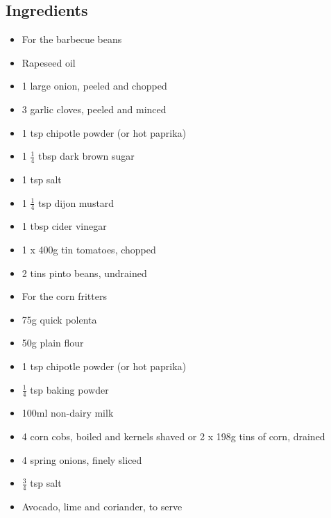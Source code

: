 \documentclass{book}
\begin{document}
\subsection*{Ingredients}
\begin{itemize}
\item For the barbecue beans 
\item Rapeseed oil 
\item 1 large onion, peeled and chopped 
\item 3 garlic cloves, peeled and minced 
\item 1 tsp chipotle powder (or hot paprika)
\item 1 $\frac{1}{4}$ tbsp dark brown sugar 
\item 1 tsp salt
\item 1 $\frac{1}{4}$ tsp dijon mustard 
\item 1 tbsp cider vinegar 
\item 1 x 400g tin tomatoes, chopped
\item 2 tins pinto beans, undrained
\end{itemize}

\begin{itemize}
\item For the corn fritters 
\item 75g quick polenta
\item 50g plain flour 
\item 1 tsp chipotle powder (or hot paprika) 
\item $\frac{1}{4}$ tsp baking powder 
\item 100ml non-dairy milk 
\item 4 corn cobs, boiled and kernels shaved or 2 x 198g tins of corn, drained
\item 4 spring onions, finely sliced
\item $\frac{3}{4}$ tsp salt 
\item Avocado, lime and coriander, to serve
\end{itemize}
\end{document}
